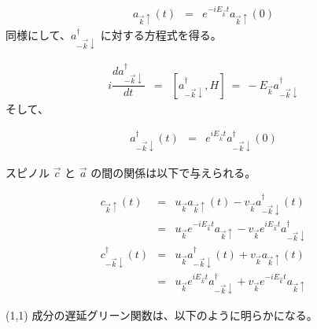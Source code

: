\documentclass[uplatex,a4j,12pt,dvipdfmx]{jsarticle}
\begin{document}
\begin{eqnarray}
	a_{\vec{k} \uparrow}(t)
	&=&
	e^{ - i E_{\vec{k}} t }
	a_{\vec{k} \uparrow}(0)
\end{eqnarray}
%
同様にして、$a_{-\vec{k} \downarrow}^{\dagger}$ に対する方程式を得る。

\begin{eqnarray}
	i \dfrac{d a_{-\vec{k} \downarrow}^{\dagger} }{dt}
	&=&
	\left[ a_{-\vec{k} \downarrow}^{\dagger} , H \right]
	\ = \
	-
	E_{\vec{k}}
	a_{-\vec{k} \downarrow}^{\dagger}
\end{eqnarray}
%
そして、

\begin{eqnarray}
	a_{-\vec{k} \downarrow}^{\dagger}(t)
	&=&
	e^{ i E_{\vec{k}} t }
	a_{-\vec{k} \downarrow}^{\dagger}(0)
\end{eqnarray}
%

スピノル $\vec{c}$ と $\vec{a}$ の間の関係は以下で与えられる。

\begin{eqnarray}
	c_{\vec{k} \uparrow}(t)
	&=&
	u_{\vec{k}} a_{\vec{k} \uparrow}(t)
	-
	v_{\vec{k}} a_{- \vec{k} \downarrow}^{\dagger}(t)
	\nonumber \\[2mm]
	&=&
	u_{\vec{k}} e^{ - i E_{\vec{k}} t }
	a_{\vec{k} \uparrow}
	-
	v_{\vec{k}} e^{ i E_{\vec{k}} t }
	a_{-\vec{k} \downarrow}^{\dagger}
	\\[5mm]
	c_{- \vec{k} \downarrow}^{\dagger}(t)
	&=&
	u_{\vec{k}} a_{- \vec{k} \downarrow}^{\dagger}(t)
	+
	v_{\vec{k}} a_{\vec{k} \uparrow}(t)
	\nonumber \\[2mm]
	&=&
	u_{\vec{k}} e^{ i E_{\vec{k}} t }
	a_{-\vec{k} \downarrow}^{\dagger}
	+
	v_{\vec{k}} e^{ - i E_{\vec{k}} t }
	a_{\vec{k} \uparrow}
\end{eqnarray}
%

(1,1) 成分の遅延グリーン関数は、以下のように明らかになる。
\end{document}

